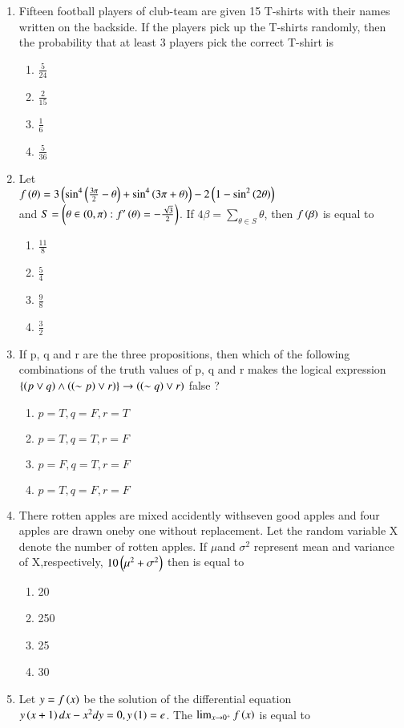 \documentclass[journal]{IEEEtran}
\begin{document}
\begin{enumerate}[start=16]
\item Fifteen football players of club-team are given 15 T-shirts with their names written on the backside. If the players pick up the T-shirts randomly, then the probability that at least 3 players pick the correct T-shirt is
\begin{enumerate}
    \item $\frac{5}{24}$
    \item $\frac{2}{15}$
    \item $\frac{1}{6}$
    \item $\frac{5}{36}$
\end{enumerate}
\item Let \\$f\left(\theta\right) = 3 \left( \sin^{4}\left( \frac{3\pi}{2} - \theta \right) + \sin^{4}\left( 3\pi + \theta \right) \right) - 2 \left( 1 - \sin^{2}\left(2\theta\right) \right)$
\\and $S= \left( \theta \in \left(0, \pi\right) : f'\left(\theta\right) = -\frac{\sqrt{3}}{2} \right)$. If $ 4\beta = \sum_{\theta \in S} \theta $, then $ f\left(\beta\right) $ is equal to 
\begin{enumerate}
    \item $\frac{11}{8}$
    \item $\frac{5}{4}$
    \item $\frac{9}{8}$
    \item $\frac{3}{2}$
\end{enumerate}
\item If p, q and r are the three propositions, then which of the following combinations of the truth values of p, q and r makes the logical expression 
$\left\{\left(p \lor q\right)\land \left(\left(\sim p\right)\lor r\right)\right\} \to \left(\left(\sim q\right) \lor r\right)$ false ?
\begin{enumerate}
    \item $p=T,q=F,r=T$
    \item $p=T,q=T,r=F$
    \item $p=F,q=T,r=F$
    \item $p=T,q=F,r=F$
\end{enumerate}
\item There rotten apples are mixed accidently withseven good apples and four apples are drawn oneby one without replacement. Let the random
variable X denote the number of rotten apples. If $\mu$and $\sigma^{2}$ represent mean and variance of X,respectively, $10\left(\mu^{2}+\sigma^{2}\right)$ then  is equal to 
\begin{enumerate}
    \item 20
    \item 250
    \item 25
    \item 30
\end{enumerate}
\item Let $y=f\left(x\right)$ be the solution of the differential equation $y\left(x+1\right)dx-x^{2}dy=0,y\left(1\right)=e$. The $\lim_{x\to0^{+}}f\left(x\right)$ is equal to 


\end{enumerate}
\end{document}

